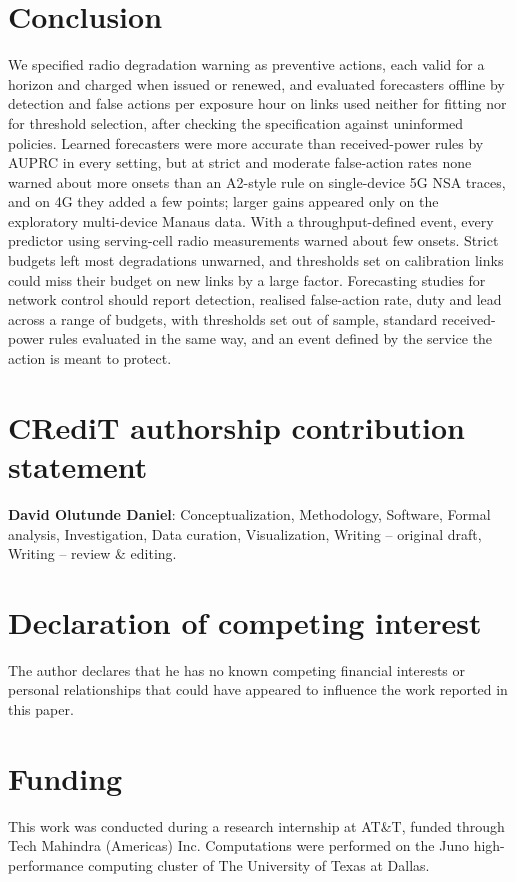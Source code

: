 \documentclass[preprint,review,12pt]{elsarticle}
\begin{document}
\section{Conclusion}
\label{sec:conclusion}
We specified radio degradation warning as preventive actions, each valid for a horizon
and charged when issued or renewed, and evaluated forecasters offline by detection and
false actions per exposure hour on links used neither for fitting nor for threshold
selection, after checking the specification against uninformed policies. Learned
forecasters were more accurate than received-power rules by AUPRC in every setting, but
at strict and moderate false-action rates none warned about more onsets than an
A2-style rule on single-device 5G NSA traces, and on 4G they added a few points; larger
gains appeared only on the exploratory multi-device Manaus data. With a throughput-defined
event, every predictor using serving-cell radio measurements warned about few onsets. Strict budgets left most
degradations unwarned, and thresholds set on calibration links could miss their budget
on new links by a large factor. Forecasting studies for network control should report
detection, realised false-action rate, duty and lead across a range of budgets, with
thresholds set out of sample, standard received-power rules evaluated in the same way,
and an event defined by the service the action is meant to protect.

\section*{CRediT authorship contribution statement}
\textbf{David Olutunde Daniel}: Conceptualization, Methodology, Software, Formal
analysis, Investigation, Data curation, Visualization, Writing -- original draft,
Writing -- review \& editing.

\section*{Declaration of competing interest}
The author declares that he has no known competing financial interests or personal
relationships that could have appeared to influence the work reported in this paper.

\section*{Funding}
This work was conducted during a research internship at AT\&T, funded through Tech
Mahindra (Americas) Inc. Computations were performed on the Juno high-performance
computing cluster of The University of Texas at Dallas.
\end{document}
